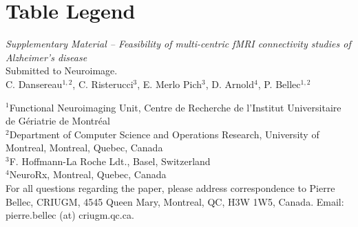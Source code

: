 \documentclass[authoryear]{elsarticle}
\begin{document}
\section{Table Legend}

\clearpage
\appendix


\clearpage
\pagebreak
\renewcommand{\thefigure}{S\arabic{figure}}
\renewcommand{\thetable}{S\arabic{table}}
\setcounter{figure}{0}
\begin{center}
\emph{Supplementary Material {--} Feasibility of multi-centric fMRI connectivity studies of Alzheimer's disease}\\

\vspace{\baselineskip}Submitted to Neuroimage.\\

\vspace{\baselineskip}C. Dansereau$^{1,2}$,  C. Risterucci$^{3}$, E. Merlo Pich$^{3}$, D. Arnold$^{4}$, P. Bellec$^{1,2}$\\

\end{center}
$^1$Functional Neuroimaging Unit, Centre de Recherche de l'Institut Universitaire de G\'eriatrie de Montr\'eal\\
$^2$Department of Computer Science and Operations Research, University of Montreal, Montreal, Quebec, Canada\\
$^3$F. Hoffmann-La Roche Ldt., Basel, Switzerland\\
$^4$NeuroRx, Montreal, Quebec, Canada\\

For all questions regarding the paper, please address correspondence to Pierre Bellec, CRIUGM, 4545 Queen Mary, Montreal, QC, H3W 1W5, Canada. Email: pierre.bellec (at) criugm.qc.ca.\\
\end{document}
